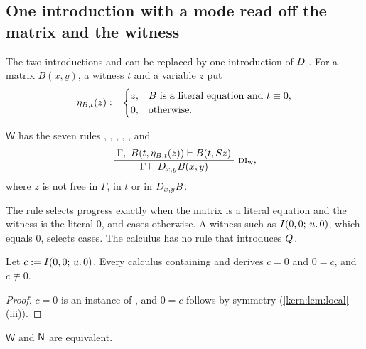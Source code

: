 \subsection{One introduction with a mode read off the matrix and the witness}
\label{kern:sec:witness}

The two introductions  and  can be replaced by one
introduction of $D_{,}$.  For a matrix $B(x,y)$, a witness $t$ and a
variable $z$ put
\[
 \eta_{B,t}(z)\mathrel{:=}
 \begin{cases}
  z, & B\text{ is a literal equation and }t\equiv 0,\\
  0, & \text{otherwise.}
 \end{cases}
\]

\begin{definition}
\label{kern:def:W}
$\mathsf{W}$ has the seven rules , ,
, , ,  and
\[
 \infrule{\Gamma,\ B(t,\eta_{B,t}(z))\proves B(t,\Suc z)}
         {\Gamma\proves\D{x}{y}B(x,y)}\ \rulename{DI}_{\mathrm{w}},
\]
where $z$ is not free in $\Gamma$, in $t$ or in $D_{x,y}B$.
\end{definition}

The rule selects progress exactly when the matrix is a literal equation and
the witness is the literal $0$, and cases otherwise.  A witness such as
$I(0,0;\,u.\,0)$, which equals $0$, selects cases.  The calculus has no rule
that introduces $Q_{}$.

\begin{lemma}
\label{kern:lem:alias}
Let $c\mathrel{:=}I(0,0;\,u.\,0)$.  Every calculus containing  and
 derives $c=0$ and $0=c$, and $c\not\equiv 0$.
\end{lemma}

\begin{proof}
$c=0$ is an instance of , and $0=c$ follows by symmetry
(\cref{kern:lem:local}(iii)).
\end{proof}

\begin{theorem}
\label{kern:thm:witness}
$\mathsf{W}$ and $\mathsf{N}$ are equivalent.
\end{theorem}

